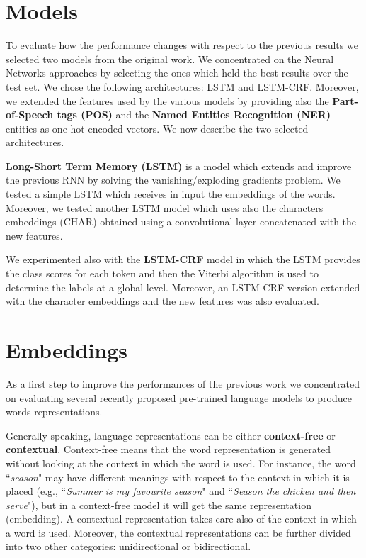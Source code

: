 \documentclass[11pt,a4paper]{article}
\begin{document}
\section{Models}

To evaluate how the performance changes with respect 
to the previous results we selected two models from 
the original work. We concentrated on the Neural 
Networks approaches by selecting the ones which held 
the best results over the test set. We chose the 
following architectures: LSTM and LSTM-CRF.  
Moreover, we extended the features used by the 
various models by providing also the \textbf{Part-of-Speech 
tags (POS)} and the \textbf{Named Entities Recognition (NER)} 
entities as one-hot-encoded vectors. We now describe the two selected architectures.

\textbf{Long-Short Term Memory (LSTM)} \cite{lstm} is a model 
which extends and improve the previous RNN by 
solving the vanishing/exploding gradients problem. 
We tested a simple LSTM which receives in input the 
embeddings of the words. Moreover, we tested another LSTM model which uses also the characters embeddings (CHAR) obtained using a convolutional layer concatenated with the new features. 

We experimented also with the \textbf{LSTM-CRF} model \cite{
yao2014recurrent, DBLP:journals/corr/HuangXY15} in 
which the LSTM provides the class scores for each 
token and then the Viterbi algorithm is used to 
determine the labels at a global level. Moreover, an 
LSTM-CRF version extended with the character 
embeddings and the new features was also evaluated.

\section{Embeddings}

As a first step to improve the performances of the previous work we concentrated on evaluating several recently proposed pre-trained language models to produce words representations.

Generally speaking, language representations can be either \textbf{context-free} or \textbf{contextual}. 
Context-free means that the word representation is generated without looking at the context in which the word is used. For instance, the word ``\textit{season}" may have different meanings with respect to the context in which it is placed (e.g., ``\textit{Summer is my favourite season}" and ``\textit{Season the chicken and then serve}"), but in a context-free model it will get the same representation (embedding). A contextual representation takes care also of the context in which a word is used.
Moreover, the contextual representations can be further divided into two other categories: unidirectional or bidirectional. 
\end{document}
